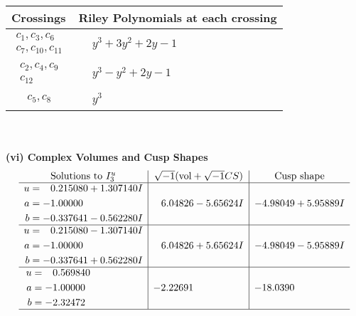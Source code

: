 \documentclass[1p]{elsarticle_modified}
\theoremstyle{definition}
\newcommand{\I}{\sqrt{-1}}
\begin{document}
\begin{tabular}{m{50pt}|m{274pt}}
Crossings & \hspace{64pt}Riley Polynomials at each crossing \\
\hline $$\begin{aligned}c_{1},c_{3},c_{6}\\c_{7},c_{10},c_{11}\end{aligned}$$&$\begin{aligned}
&y^3+3 y^2+2 y-1
\end{aligned}$\\
\hline $$\begin{aligned}c_{2},c_{4},c_{9}\\c_{12}\end{aligned}$$&$\begin{aligned}
&y^3- y^2+2 y-1
\end{aligned}$\\
\hline $$\begin{aligned}c_{5},c_{8}\end{aligned}$$&$\begin{aligned}
&y^3
\end{aligned}$\\
\hline
\end{tabular}\\~\\
\newpage\flushleft \textbf{(vi) Complex Volumes and Cusp Shapes}
$$\begin{array}{c|c|c}  
\text{Solutions to }I^u_{3}& \I (\text{vol} + \sqrt{-1}CS) & \text{Cusp shape}\\
 \hline 
\begin{aligned}
u &= \phantom{-}0.215080 + 1.307140 I \\
a &= -1.00000\phantom{ +0.000000I} \\
b &= -0.337641 - 0.562280 I\end{aligned}
 & \phantom{-}6.04826 - 5.65624 I & -4.98049 + 5.95889 I \\ \hline\begin{aligned}
u &= \phantom{-}0.215080 - 1.307140 I \\
a &= -1.00000\phantom{ +0.000000I} \\
b &= -0.337641 + 0.562280 I\end{aligned}
 & \phantom{-}6.04826 + 5.65624 I & -4.98049 - 5.95889 I \\ \hline\begin{aligned}
u &= \phantom{-}0.569840\phantom{ +0.000000I} \\
a &= -1.00000\phantom{ +0.000000I} \\
b &= -2.32472\phantom{ +0.000000I}\end{aligned}
 & -2.22691\phantom{ +0.000000I} & -18.0390\phantom{ +0.000000I}\\
 \hline 
 \end{array}$$\newpage\newpage\renewcommand{\arraystretch}{1}
\end{document}
